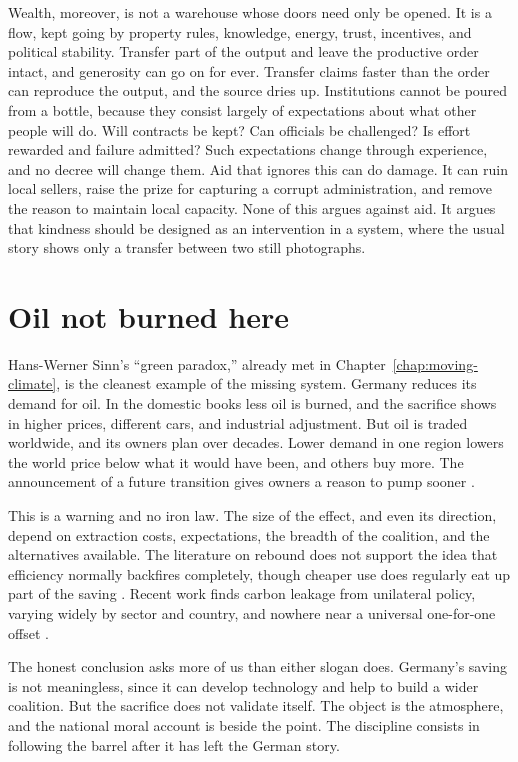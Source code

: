 \documentclass[12pt,a4paper]{book}
\begin{document}
Wealth, moreover, is not a warehouse whose doors need only be opened. It is a flow, kept going by property rules, knowledge, energy, trust, incentives, and political stability. Transfer part of the output and leave the productive order intact, and generosity can go on for ever. Transfer claims faster than the order can reproduce the output, and the source dries up. Institutions cannot be poured from a bottle, because they consist largely of expectations about what other people will do. Will contracts be kept? Can officials be challenged? Is effort rewarded and failure admitted? Such expectations change through experience, and no decree will change them. Aid that ignores this can do damage. It can ruin local sellers, raise the prize for capturing a corrupt administration, and remove the reason to maintain local capacity. None of this argues against aid. It argues that kindness should be designed as an intervention in a system, where the usual story shows only a transfer between two still photographs.

\section{Oil not burned here}

Hans-Werner Sinn's ``green paradox,'' already met in Chapter~\ref{chap:moving-climate}, is the cleanest example of the missing system. Germany reduces its demand for oil. In the domestic books less oil is burned, and the sacrifice shows in higher prices, different cars, and industrial adjustment. But oil is traded worldwide, and its owners plan over decades. Lower demand in one region lowers the world price below what it would have been, and others buy more. The announcement of a future transition gives owners a reason to pump sooner \cite{Sinn2015}.

This is a warning and no iron law. The size of the effect, and even its direction, depend on extraction costs, expectations, the breadth of the coalition, and the alternatives available. The literature on rebound does not support the idea that efficiency normally backfires completely, though cheaper use does regularly eat up part of the saving \cite{GillinghamRapsonWagner2016}. Recent work finds carbon leakage from unilateral policy, varying widely by sector and country, and nowhere near a universal one-for-one offset \cite{HemmerleKrusePisu2025}.

The honest conclusion asks more of us than either slogan does. Germany's saving is not meaningless, since it can develop technology and help to build a wider coalition. But the sacrifice does not validate itself. The object is the atmosphere, and the national moral account is beside the point. The discipline consists in following the barrel after it has left the German story.
\end{document}

